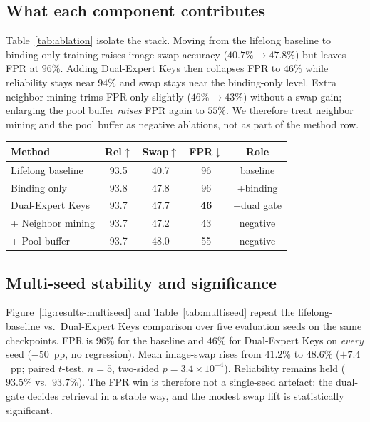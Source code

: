 \documentclass[letterpaper]{article} %
\begin{document}
\subsection{What each component contributes}

Table~\ref{tab:ablation} isolate the stack.
Moving from the lifelong baseline to binding-only training raises image-swap accuracy ($40.7\%\!\rightarrow\!47.8\%$) but leaves FPR at $96\%$.
Adding Dual-Expert Keys then collapses FPR to $46\%$ while reliability stays near $94\%$ and swap stays near the binding-only level.
Extra neighbor mining trims FPR only slightly ($46\%\!\rightarrow\!43\%$) without a swap gain; enlarging the pool buffer \emph{raises} FPR again to $55\%$.
We therefore treat neighbor mining and the pool buffer as negative ablations, not as part of the method row.


\begin{center}
\small
\setlength{\tabcolsep}{3pt}
\begin{tabular}{@{}lcccc@{}}
\toprule
Method & Rel$\uparrow$ & Swap$\uparrow$ & FPR$\downarrow$ & Role \\
\midrule
Lifelong baseline & 93.5 & 40.7 & 96 & baseline \\
Binding only & 93.8 & 47.8 & 96 & +binding \\
Dual-Expert Keys & 93.7 & 47.7 & \textbf{46} & +dual gate \\
+ Neighbor mining & 93.7 & 47.2 & 43 & negative \\
+ Pool buffer & 93.7 & 48.0 & 55 & negative \\
\bottomrule
\end{tabular}
\label{tab:ablation}
\end{center}

\subsection{Multi-seed stability and significance}
Figure~\ref{fig:results-multiseed} and Table~\ref{tab:multiseed} repeat the lifelong-baseline vs.\ Dual-Expert Keys comparison over five evaluation seeds on the same checkpoints.
FPR is $96\%$ for the baseline and $46\%$ for Dual-Expert Keys on \emph{every} seed ($-50$~pp, no regression).
Mean image-swap rises from $41.2\%$ to $48.6\%$ ($+7.4$~pp; paired $t$-test, $n{=}5$, two-sided $p{=}3.4{\times}10^{-4}$).
Reliability remains held ($93.5\%$ vs.\ $93.7\%$).
The FPR win is therefore not a single-seed artefact: the dual-gate decides retrieval in a stable way, and the modest swap lift is statistically significant.
\end{document}
